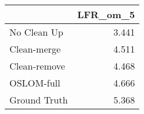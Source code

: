 \begin{tabular}{lr}
\toprule
{} & LFR_om_5 \\
\midrule
No Clean Up  &    3.441 \\
Clean-merge  &    4.511 \\
Clean-remove &    4.468 \\
OSLOM-full   &    4.666 \\
Ground Truth &    5.368 \\
\bottomrule
\end{tabular}
